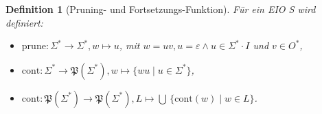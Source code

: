 \documentclass[mathserif, xcolor=dvipsnames]{beamer}
\newtheorem{Def}{Definition}
\newcommand{\EIO}{EIO}
\newcommand{\prune}{\ensuremath{\mathrm{prune}}}
\newcommand{\cont}{\ensuremath{\mathrm{cont}}}
\begin{document}
\begin{frame}
  \begin{Def}[Pruning- und Fortsetzungs-Funktion]
    Für ein \EIO{} S wird definiert:
    \begin{itemize}
      \item $\prune :\Sigma ^*\rightarrow\Sigma ^*, w\mapsto u$, mit $w=uv,
        u=\varepsilon \wedge u\in\Sigma ^* \cdot I$ und $v\in O^*$,
      \item $\cont :\Sigma ^*\rightarrow \mathfrak{P}(\Sigma ^*), w\mapsto
        \{wu\mid u\in\Sigma ^*\}$,
      \item $\cont :\mathfrak{P}(\Sigma ^*)\rightarrow \mathfrak{P}(\Sigma ^*),
        L\mapsto \bigcup\,\{\cont (w)\mid w\in L\}$.
    \end{itemize}
  \end{Def}
\end{frame}
\end{document}
